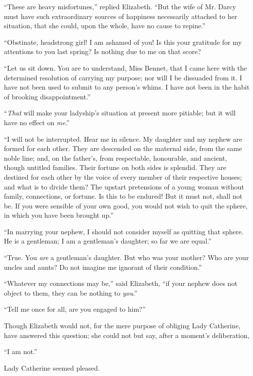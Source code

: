 “These are heavy misfortunes,” replied Elizabeth.
“But the wife of Mr. Darcy must have such extraordinary
sources of happiness necessarily attached to her situation,
that she could, upon the whole, have no cause to repine.”

“Obstinate, headstrong girl! I am ashamed of you!
Is this your gratitude for my attentions to you last
spring? Is nothing due to me on that score?

“Let us sit down. You are to understand, Miss Bennet,
that I came here with the determined resolution of
carrying my purpose; nor will I be dissuaded from it.
I have not been used to submit to any person’s whims.
I have not been in the habit of brooking disappointment.”

“\textit{That} will make your ladyship’s situation at present
more pitiable; but it will have no effect on \textit{me}.”

“I will not be interrupted. Hear me in silence. My
daughter and my nephew are formed for each other. They
are descended on the maternal side, from the same noble
line; and, on the father’s, from respectable, honourable,
and ancient, though untitled families. Their fortune on
both sides is splendid. They are destined for each other
by the voice of every member of their respective houses;
and what is to divide them? The upstart pretensions of
a young woman without family, connections, or fortune.
Is this to be endured! But it must not, shall not be. If
you were sensible of your own good, you would not wish
to quit the sphere, in which you have been brought up.”

“In marrying your nephew, I should not consider myself
as quitting that sphere. He is a gentleman; I am a gentleman’s
daughter; so far we are equal.”

“True. You \textit{are} a gentleman’s daughter. But who was
your mother? Who are your uncles and aunts? Do not
imagine me ignorant of their condition.”

“Whatever my connections may be,” said Elizabeth,
“if your nephew does not object to them, they can be
nothing to \textit{you}.”

“Tell me once for all, are you engaged to him?”

Though Elizabeth would not, for the mere purpose of
obliging Lady Catherine, have answered this question;
she could not but say, after a moment’s deliberation,

“I am not.”

Lady Catherine seemed pleased.

